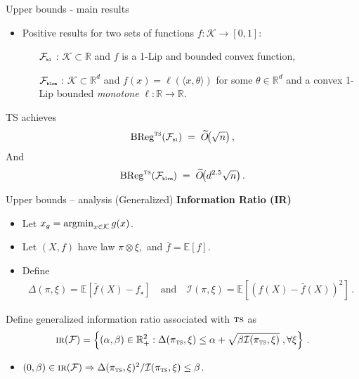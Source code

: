 \documentclass{beamer}
\newcommand{\BReg}{\operatorname{BReg}}
\newcommand{\argmin}{\operatornamewithlimits{argmin}}
\newcommand{\E}{\mathbb{E}}
\newcommand{\R}{\mathbb{R}}
\newcommand{\cK}{\mathcal{K}}
\newcommand{\cF}{\mathcal{F}}
\newcommand{\cI}{\mathcal{I}}
\newcommand{\ts}{{\textsc{ts}}}
\newcommand{\pr}{\text{\tiny\texttt{r}}}
\newcommand{\pb}{\text{\tiny\texttt{b}}}
\newcommand{\pl}{\text{\tiny\texttt{l}}}
\renewcommand{\pm}{\text{\tiny\texttt{m}}}
\newcommand{\IR}{\operatorname{\textsc{ir}}}
\begin{document}
\begin{frame}{Upper bounds - main results}
    \begin{itemize}
        \item Positive results for two sets of functions $f:\cK \to [0,1]$:\vspace{1em}
              \begin{enumerate}
                  \large
                  \setlength{\itemsep}{1em} %
                  \item[$\cF_{\pb\pl}$]: $\cK \subset \R$ and $f$ is a 1-Lip and bounded convex function,
                  \item[$\cF_{\pb\pl\pr\pm}$] : $\cK \subset \R^d$ and $f(x) = \ell(\langle x, \theta\rangle)$ for some $\theta\in\R^d$ and a convex 1-Lip bounded \emph{monotone} $\ell: \R \to \R$.
              \end{enumerate}
    \end{itemize}
    \begin{tcolorbox}[title=Upper bounds -- 1-D convex functions,colback=blue!5!white,colframe=blue!50!black]
        TS achieves
        \[
            \BReg^{\ts}(\cF_{\pb\pl})\;=\; \widetilde{O}\!\bigl(\sqrt{n}\bigr)\,,
        \]
        And
        \[
            \BReg^{\ts}(\cF_{\pb\pl\pr\pm})\;=\; \widetilde{O}\!\bigl(d^{2.5}\sqrt{n}\bigr)\,.
        \]
    \end{tcolorbox}
\end{frame}


\begin{frame}{Upper bounds -- analysis}
    (Generalized) \textbf{Information Ratio (IR)}
    \vspace{0.5em}
    \small
    \begin{itemize}
        \item Let $x_g = \argmin_{x\in\cK} g(x)$.
        \item Let $(X,f)$ have law $\pi \otimes \xi,$ and $\bar{f} = \E[f]$.
        \item Define
              \begin{align*}
                  \Delta(\pi, \xi) = \E[\bar{f}(X) - f_\star]
                  \quad \text{and} \quad \cI(\pi, \xi) = \E[(f(X) - \bar{f}(X))^2]\,.
              \end{align*}
    \end{itemize}
    \begin{tcolorbox}[title=Generalized IR ,colback=green!5!white,colframe=green!50!black]
        Define generalized information ratio associated with $\ts$ as
        \[
            \IR(\cF) = \left\{(\alpha, \beta) \in \R_+^2 : \Delta(\pi_{\ts}, \xi) \leq \alpha + \sqrt{\beta \cI(\pi_{\ts}, \xi)}  \;,\forall \xi\right\} \,.
        \]
    \end{tcolorbox}
    \begin{itemize}
        \item $(0,\beta) \in \IR(\cF) \Rightarrow \Delta(\pi_{\ts}, \xi)^2/\cI(\pi_{\ts}, \xi) \leq \beta$.
    \end{itemize}
\end{frame}
\end{document}
